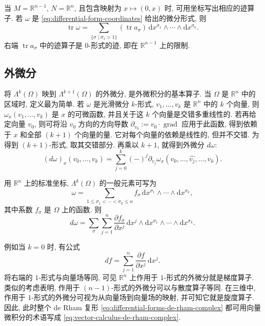 当 $M=\mathbb R^{n-1}$, $N=\mathbb R^n$, 且包含映射为 $x\mapsto(0,x)$ 时, 可用坐标写出相应的迹算子. 若 $\omega$ 是 \eqref{eq:differential-form-coordinates} 给出的微分形式, 则
\begin{equation}\label{eq:differential-trace-coordinates}
\operatorname{tr}\omega=\sum_{\{\sigma\mid\sigma_1>1\}}(\operatorname{tr}a_\sigma)\,\mathrm{d}x^{\sigma_1}\wedge\cdots\wedge \mathrm{d}x^{\sigma_k}.
\end{equation}
右端 $\operatorname{tr}a_\sigma$ 中的迹算子是 $0$-形式的迹, 即在 $\mathbb R^{n-1}$ 上的限制.

\subsection{外微分}\label{subsec:exterior-derivative}

将 $\Lambda^k(\Omega)$ 映到 $\Lambda^{k+1}(\Omega)$ 的外微分, 是外微积分的基本算子. 当 $\Omega$ 是 $\mathbb R^n$ 中的区域时, 定义最为简单. 若 $\omega$ 是光滑微分 $k$-形式, $v_1,\ldots,v_k$ 是 $\mathbb R^n$ 中的 $k$ 个向量, 则 $\omega_x(v_1,\ldots,v_k)$ 是 $x$ 的可微函数, 并且关于这 $k$ 个向量是交错多重线性的. 若再给定向量 $v_0$, 则可将沿 $v_0$ 方向的方向导数 $\partial_{v_0}:=v_0\cdot\operatorname{grad}$ 应用于此函数, 得到依赖于 $x$ 和全部 $(k+1)$ 个向量的量. 它对每个向量的依赖是线性的, 但并不交错. 为得到 $(k+1)$-形式, 取其交错部分. 再乘以 $k+1$, 就得到外微分 $d\omega$:
\[
(d\omega)_x(v_0,\ldots,v_k)=\sum_{j=0}^k(-)^j\partial_{v_j}\omega_x(v_0,\ldots,\widehat{v_j},\ldots,v_k).
\]

用 $\mathbb R^n$ 上的标准坐标, $\Lambda^k(\Omega)$ 的一般元素可写为
\[
\omega=\sum_{1\leq\sigma_1<\cdots<\sigma_k\leq n}f_\sigma\,\mathrm{d}x^{\sigma_1}\wedge\cdots\wedge \mathrm{d}x^{\sigma_k},
\]
其中系数 $f_\sigma$ 是 $\Omega$ 上的函数. 则
\begin{equation}\label{eq:exterior-derivative-coordinates}
d\omega=\sum_\sigma\sum_{j=1}^n\frac{\partial f_\sigma}{\partial x^j}\,\mathrm{d}x^j\wedge \mathrm{d}x^{\sigma_1}\wedge\cdots\wedge \mathrm{d}x^{\sigma_k}.
\end{equation}

例如当 $k=0$ 时, 有公式
\[
df=\sum_{j=1}^n\frac{\partial f}{\partial x^j}\,\mathrm{d}x^j.
\]
将右端的 $1$-形式与向量场等同, 可见 $\mathbb R^n$ 上作用于 $1$-形式的外微分就是梯度算子. 类似的考虑表明, 作用于 $(n-1)$-形式的外微分可以与散度算子等同. 在三维中, 作用于 $1$-形式的外微分可视为从向量场到向量场的映射, 并可知它就是旋度算子. 因此, 此时整个 de Rham 复形 \eqref{eq:differential-forms-de-rham-complex} 都可用向量微积分的术语写成 \eqref{eq:vector-calculus-de-rham-complex}.

